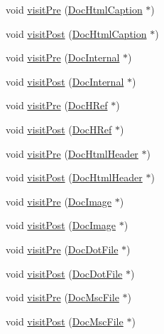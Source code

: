 \begin{DoxyCompactItemize}
void \hyperlink{class_perl_mod_doc_visitor_acaaa0480658a34e11e5b1aad8ee63457}{visit\+Pre} (\hyperlink{class_doc_html_caption}{Doc\+Html\+Caption} $\ast$)
\item 
void \hyperlink{class_perl_mod_doc_visitor_ac28afd1f25d63783d679c82e39ef253f}{visit\+Post} (\hyperlink{class_doc_html_caption}{Doc\+Html\+Caption} $\ast$)
\item 
void \hyperlink{class_perl_mod_doc_visitor_a7a8ff462808486a306f14fbde81c6bb3}{visit\+Pre} (\hyperlink{class_doc_internal}{Doc\+Internal} $\ast$)
\item 
void \hyperlink{class_perl_mod_doc_visitor_ac505e8452a99dae2774584b128a2c7fd}{visit\+Post} (\hyperlink{class_doc_internal}{Doc\+Internal} $\ast$)
\item 
void \hyperlink{class_perl_mod_doc_visitor_a26155d37f6c88c2abee0c065a8a0c395}{visit\+Pre} (\hyperlink{class_doc_h_ref}{Doc\+H\+Ref} $\ast$)
\item 
void \hyperlink{class_perl_mod_doc_visitor_a1ad9a44c324b29e1509abfa80968c833}{visit\+Post} (\hyperlink{class_doc_h_ref}{Doc\+H\+Ref} $\ast$)
\item 
void \hyperlink{class_perl_mod_doc_visitor_aceec53b97c9e9727ec1468d09df21f1a}{visit\+Pre} (\hyperlink{class_doc_html_header}{Doc\+Html\+Header} $\ast$)
\item 
void \hyperlink{class_perl_mod_doc_visitor_ac06d0307a826667060ef18bcfc449517}{visit\+Post} (\hyperlink{class_doc_html_header}{Doc\+Html\+Header} $\ast$)
\item 
void \hyperlink{class_perl_mod_doc_visitor_ac2770c73a07897de98b4b7bbed8607bc}{visit\+Pre} (\hyperlink{class_doc_image}{Doc\+Image} $\ast$)
\item 
void \hyperlink{class_perl_mod_doc_visitor_a82d93478d1ddc9f3edc8ad12af70553c}{visit\+Post} (\hyperlink{class_doc_image}{Doc\+Image} $\ast$)
\item 
void \hyperlink{class_perl_mod_doc_visitor_a57c81e62d63f85e79cd0aff2c826387c}{visit\+Pre} (\hyperlink{class_doc_dot_file}{Doc\+Dot\+File} $\ast$)
\item 
void \hyperlink{class_perl_mod_doc_visitor_a839751ef549f372f025a5bdd3a25f184}{visit\+Post} (\hyperlink{class_doc_dot_file}{Doc\+Dot\+File} $\ast$)
\item 
void \hyperlink{class_perl_mod_doc_visitor_a37ac8a8cb63c2aed087032c8e4c5641a}{visit\+Pre} (\hyperlink{class_doc_msc_file}{Doc\+Msc\+File} $\ast$)
\item 
void \hyperlink{class_perl_mod_doc_visitor_a8aca46a8d566cd8675423558a681109d}{visit\+Post} (\hyperlink{class_doc_msc_file}{Doc\+Msc\+File} $\ast$)

\end{DoxyCompactItemize}
